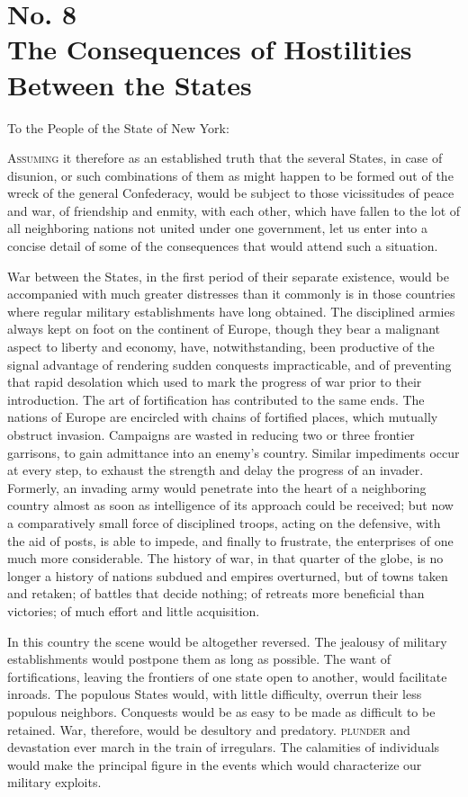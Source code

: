 \chapter[No. 8: The Consequences of Hostilities Between the States]{No. 8\\ {\small The Consequences of Hostilities Between the States}}
To the People of the State of New York:
\vspace{.4cm}

\textsc{Assuming} it therefore as an established truth that the several States, in case of disunion, or such combinations of them as might happen to be formed out of the wreck of the general Confederacy, would be subject to those vicissitudes of peace and war, of friendship and enmity, with each other, which have fallen to the lot of all neighboring nations not united under one government, let us enter into a concise detail of some of the consequences that would attend such a situation.

War between the States, in the first period of their separate existence, would be accompanied with much greater distresses than it commonly is in those countries where regular military establishments have long obtained. The disciplined armies always kept on foot on the continent of Europe, though they bear a malignant aspect to liberty and economy, have, notwithstanding, been productive of the signal advantage of rendering sudden conquests impracticable, and of preventing that rapid desolation which used to mark the progress of war prior to their introduction. The art of fortification has contributed to the same ends. The nations of Europe are encircled with chains of fortified places, which mutually obstruct invasion. Campaigns are wasted in reducing two or three frontier garrisons, to gain admittance into an enemy's country. Similar impediments occur at every step, to exhaust the strength and delay the progress of an invader. Formerly, an invading army would penetrate into the heart of a neighboring country almost as soon as intelligence of its approach could be received; but now a comparatively small force of disciplined troops, acting on the defensive, with the aid of posts, is able to impede, and finally to frustrate, the enterprises of one much more considerable. The history of war, in that quarter of the globe, is no longer a history of nations subdued and empires overturned, but of towns taken and retaken; of battles that decide nothing; of retreats more beneficial than victories; of much effort and little acquisition.

In this country the scene would be altogether reversed. The jealousy of military establishments would postpone them as long as possible. The want of fortifications, leaving the frontiers of one state open to another, would facilitate inroads. The populous States would, with little difficulty, overrun their less populous neighbors. Conquests would be as easy to be made as difficult to be retained. War, therefore, would be desultory and predatory. \textsc{plunder} and devastation ever march in the train of irregulars. The calamities of individuals would make the principal figure in the events which would characterize our military exploits.

